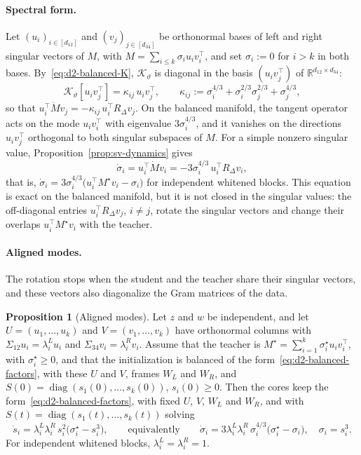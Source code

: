 \documentclass[11pt]{article}
\newcommand{\diag}{\operatorname{diag}}
\newcommand{\R}{\mathbb{R}}
\theoremstyle{definition}
\newtheorem{proposition}[theorem]{Proposition}
\numberwithin{equation}{section}
\begin{document}
\paragraph{Spectral form.}
Let $(u_i)_{i\in[d_{12}]}$ and $(v_j)_{j\in[d_{34}]}$ be orthonormal bases of left and right singular vectors of $M$, with $M=\sum_{i\le k}\sigma_iu_iv_i^\top$, and set $\sigma_i:=0$ for $i>k$ in both bases. By~\eqref{eq:d2-balanced-K}, $\mathcal K_\vartheta$ is diagonal in the basis $(u_iv_j^\top)$ of $\R^{d_{12}\times d_{34}}$:
\begin{equation}\label{eq:d2-balanced-kappa}
\mathcal K_\vartheta[u_iv_j^\top]=\kappa_{ij}\,u_iv_j^\top,\qquad\kappa_{ij}:=\sigma_i^{4/3}+\sigma_i^{2/3}\sigma_j^{2/3}+\sigma_j^{4/3},
\end{equation}
so that $u_i^\top\dot Mv_j=-\kappa_{ij}\,u_i^\top R_\Delta v_j$. On the balanced manifold, the tangent operator acts on the mode $u_iv_i^\top$ with eigenvalue $3\sigma_i^{4/3}$, and it vanishes on the directions $u_iv_j^\top$ orthogonal to both singular subspaces of $M$. For a simple nonzero singular value, Proposition~\ref{prop:sv-dynamics} gives
\begin{equation}\label{eq:d2-balanced-sv}
\dot\sigma_i=u_i^\top\dot Mv_i=-3\sigma_i^{4/3}\,u_i^\top R_\Delta v_i,
\end{equation}
that is, $\dot\sigma_i=3\sigma_i^{4/3}\big(u_i^\top M^\star v_i-\sigma_i\big)$ for independent whitened blocks. This equation is exact on the balanced manifold, but it is not closed in the singular values: the off-diagonal entries $u_i^\top R_\Delta v_j$, $i\neq j$, rotate the singular vectors and change their overlaps $u_i^\top M^\star v_i$ with the teacher.

\paragraph{Aligned modes.}
The rotation stops when the student and the teacher share their singular vectors, and these vectors also diagonalize the Gram matrices of the data.

\begin{proposition}[Aligned modes]\label{prop:d2-aligned}
Let $z$ and $w$ be independent, and let $U=(u_1,\dots,u_k)$ and $V=(v_1,\dots,v_k)$ have orthonormal columns with $\Sigma_{12}u_i=\lambda^L_iu_i$ and $\Sigma_{34}v_i=\lambda^R_iv_i$. Assume that the teacher is $M^\star=\sum_{i=1}^k\sigma^\star_iu_iv_i^\top$, with $\sigma^\star_i\ge0$, and that the initialization is balanced of the form~\eqref{eq:d2-balanced-factors}, with these $U$ and $V$, frames $W_L$ and $W_R$, and $S(0)=\diag(s_1(0),\dots,s_k(0))$, $s_i(0)\ge0$. Then the cores keep the form~\eqref{eq:d2-balanced-factors}, with fixed $U$, $V$, $W_L$ and $W_R$, and with $S(t)=\diag(s_1(t),\dots,s_k(t))$ solving
\begin{equation}\label{eq:d2-aligned}
\dot s_i=\lambda^L_i\lambda^R_i\,s_i^2\big(\sigma^\star_i-s_i^3\big),\qquad\text{equivalently}\qquad\dot\sigma_i=3\lambda^L_i\lambda^R_i\,\sigma_i^{4/3}\big(\sigma^\star_i-\sigma_i\big),\quad\sigma_i=s_i^3.
\end{equation}
For independent whitened blocks, $\lambda^L_i=\lambda^R_i=1$.
\end{proposition}
\end{document}
